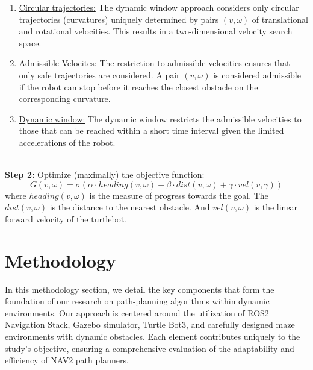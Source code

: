 \documentclass[sigconf]{acmart}
\begin{document}
\begin{enumerate}
\begin{enumerate}
    \item \underline{Circular trajectories:} The dynamic window approach considers only circular trajectories (curvatures) uniquely determined by pairs $(v, \omega)$ of translational and rotational velocities. This results in a two-dimensional velocity search space. 
    \item \underline{Admissible Velocites:} The restriction to admissible velocities ensures that only safe trajectories are considered. A pair $(v, \omega)$ is considered admissible if the robot can stop before it reaches the closest obstacle on the corresponding curvature. 
    \item \underline{Dynamic window:} The dynamic window restricts the admissible velocities to those that can be reached within a short time interval given the limited accelerations of the robot. 
\end{enumerate}
\\
\textbf{Step 2:} Optimize (maximally) the objective function:
\begin{equation*}
    G(v,\omega) = \sigma(\alpha \cdot heading(v,\omega) + \beta \cdot dist(v,\omega) + \gamma \cdot vel(v,\gamma))
\end{equation*}
where $heading(v,\omega)$ is the measure of progress towards the goal. The $dist(v,\omega)$ is the distance to the nearest obstacle. And $vel(v,\omega)$ is the linear forward velocity of the turtlebot.

\end{enumerate}

\section{Methodology}
In this methodology section, we detail the key components that form the foundation of our research on path-planning algorithms within dynamic environments. Our approach is centered around the utilization of ROS2 Navigation Stack, Gazebo simulator, Turtle Bot3, and carefully designed maze environments with dynamic obstacles. Each element contributes uniquely to the study's objective, ensuring a comprehensive evaluation of the adaptability and efficiency of NAV2 path planners.
\end{document}
